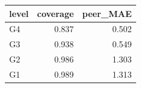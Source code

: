 \begin{tabular}{lrr}
\toprule
level & coverage & peer_MAE \\
\midrule
G4 & 0.837 & 0.502 \\
G3 & 0.938 & 0.549 \\
G2 & 0.986 & 1.303 \\
G1 & 0.989 & 1.313 \\
\bottomrule
\end{tabular}
